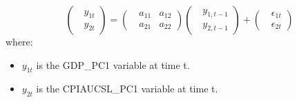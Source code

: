 \begin{equation}
    \label{VAR_1}
    \begin{pmatrix}
        \ \ \ y_{1t} \\
        \ \ \ y_{2t}
    \end{pmatrix}
    =
    \begin{pmatrix}
        \ \ \ a_{11} & a_{12} \\
        \ \ \ a_{21} & a_{22}
    \end{pmatrix}
    \begin{pmatrix}
        \ \ \ y_{1, t-1} \\
        \ \ \ y_{2, t-1}
    \end{pmatrix}
    +
    \begin{pmatrix}
        \ \ \ \epsilon_{1t} \\
        \ \ \ \epsilon_{2t}
    \end{pmatrix}
\end{equation}
where:
\begin{itemize}
    \item \(y_{1t}\) is the GDP\_PC1 variable at time t.
    \item \(y_{2t}\) is the CPIAUCSL\_PC1 variable at time t.
\end{itemize}

